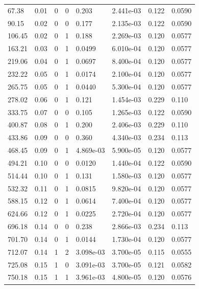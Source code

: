 \documentclass[preview]{standalone}
\begin{document}
{{\begin{tabular}{L{1.2cm}C{1.2cm} C{0.3cm}C{0.5cm} C{1.4cm}C{1.4cm} C{1.4cm}C{1.4cm}}
  67.38  &  0.01  & 0     &  0 &  0.203  & 2.441e-03  & 0.122 &  0.0590   \\ 
  90.15  &  0.02  & 0     &  0 &  0.177  & 2.135e-03  & 0.122 &  0.0590   \\ 
  106.45  &  0.02  & 0     &  1 &  0.188  & 2.269e-03  & 0.120 &  0.0577   \\ 
  163.21  &  0.03  & 0     &  1 &  0.0499  & 6.010e-04  & 0.120 &  0.0577   \\ 
  219.06  &  0.04  & 0     &  1 &  0.0697  & 8.400e-04  & 0.120 &  0.0577   \\ 
  232.22  &  0.05  & 0     &  1 &  0.0174  & 2.100e-04  & 0.120 &  0.0577   \\ 
  265.75  &  0.05  & 0     &  1 &  0.0440  & 5.300e-04  & 0.120 &  0.0577   \\ 
  278.02  &  0.06  & 0     &  1 &  0.121  & 1.454e-03  & 0.229 &  0.110   \\ 
  333.75  &  0.07  & 0     &  0 &  0.105  & 1.265e-03  & 0.122 &  0.0590   \\ 
  400.87  &  0.08  & 0     &  1 &  0.200  & 2.406e-03  & 0.229 &  0.110   \\ 
  433.86  &  0.09  & 0     &  0 &  0.360  & 4.340e-03  & 0.234 &  0.113   \\ 
  468.45  &  0.09  & 0     &  1 &  4.869e-03  & 5.900e-05  & 0.120 &  0.0577   \\ 
  494.21  &  0.10  & 0     &  0 &  0.0120  & 1.440e-04  & 0.122 &  0.0590   \\ 
  514.44  &  0.10  & 0     &  1 &  0.131  & 1.580e-03  & 0.120 &  0.0577   \\ 
  532.32  &  0.11  & 0     &  1 &  0.0815  & 9.820e-04  & 0.120 &  0.0577   \\ 
  588.15  &  0.12  & 0     &  1 &  0.0614  & 7.400e-04  & 0.120 &  0.0577   \\ 
  624.66  &  0.12  & 0     &  1 &  0.0225  & 2.720e-04  & 0.120 &  0.0577   \\ 
  696.18  &  0.14  & 0     &  0 &  0.238  & 2.866e-03  & 0.234 &  0.113   \\ 
  701.70  &  0.14  & 0     &  1 &  0.0144  & 1.730e-04  & 0.120 &  0.0577   \\ 
  712.07  &  0.14  & 1     &  2 &  3.098e-03  & 3.700e-05  & 0.115 &  0.0555   \\ 
  725.08  &  0.15  & 1     &  0 &  3.091e-03  & 3.700e-05  & 0.121 &  0.0582   \\ 
  750.18  &  0.15  & 1     &  1 &  3.961e-03  & 4.800e-05  & 0.120 &  0.0576   \\ 

\end{tabular}}}
\end{document}
